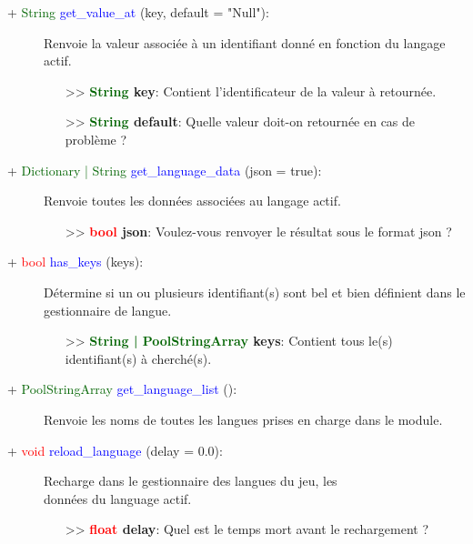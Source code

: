 \documentclass[a4paper, 11pt]{article}
\begin{document}
	\begin{description}
		\item [+ \textcolor{darkgreen}{String} \textcolor{blue}{get\_value\_at} (key, default = "Null"):]
		Renvoie la valeur associée à un identifiant donné en fonction du langage actif.
		\begin{itemize}
			\item [>> \textbf{\textcolor{darkgreen}{String} key}:] Contient l'identificateur de la valeur à
			retournée.
			\item [>> \textbf{\textcolor{darkgreen}{String} default}:] Quelle valeur doit-on retournée en 
			cas de problème ?\\
		\end{itemize}
	\end{description}
	\begin{description}
		\item [+ \textcolor{darkgreen}{Dictionary | String} \textcolor{blue}{get\_language\_data} (json =
		true):] Renvoie toutes les données associées au langage actif.
		\begin{itemize}
			\item [>> \textbf{\textcolor{red}{bool} json}:] Voulez-vous renvoyer le résultat sous le format 
			json ?\\
		\end{itemize}
	\end{description}
	\begin{description}
		\item [+ \textcolor{red}{bool} \textcolor{blue}{has\_keys} (keys):] Détermine si un ou plusieurs
		identifiant(s) sont bel et bien définient dans le gestionnaire de langue.
		\begin{itemize}
			\item [>> \textbf{\textcolor{darkgreen}{String | PoolStringArray} keys}:] Contient tous le(s)
			identifiant(s) à cherché(s).\\
		\end{itemize}
	\end{description}
	\begin{description}
		\item [+ \textcolor{darkgreen}{PoolStringArray} \textcolor{blue}{get\_language\_list} ():] Renvoie
		les noms de toutes les langues prises en charge dans le module.\\
	\end{description}
	\begin{description}
		\item [+ \textcolor{red}{void} \textcolor{blue}{reload\_language} (delay = 0.0):] Recharge dans le
		gestionnaire des langues du jeu, les \\données du language actif.
		\begin{itemize}
			\item[>> \textbf{\textcolor{red}{float} delay}:] Quel est le temps mort avant le rechargement ?
		\end{itemize}
	\end{description}
\end{document}
